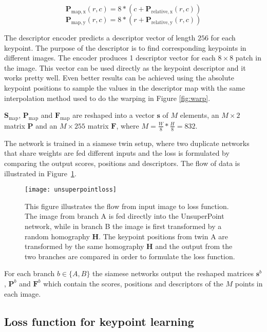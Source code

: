 \begin{equation}
\textbf{P}_{\mathrm{map,x}}(r,c) = 8 * (c + \textbf{P}_{\mathrm{relative,x}}(r,c))
\end{equation}
\begin{equation}
\textbf{P}_{\mathrm{map,y}}(r,c) = 8 * (r + \textbf{P}_{\mathrm{relative,y}}(r,c))
\end{equation}

The descriptor encoder predicts a descriptor vector of length $256$ for each keypoint. The purpose of the descriptor is to find corresponding keypoints in different images. The encoder produces 1 descriptor vector for each $8\times 8$ patch in the image. This vector can be used directly as the keypoint descriptor and it works pretty well. Even better results can be achieved using the absolute keypoint positions to sample the values in the descriptor map with the same interpolation method used to do the warping in Figure \ref{fig:warp}.

$\textbf{S}_{\textrm{map}}$, $\textbf{P}_{\mathrm{map}}$ and $\textbf{F}_{\mathrm{map}}$ are reshaped into a vector $\textbf{s}$ of $M$ elements, an $M\times 2$ matrix $\textbf{P}$ and an $M\times 255$ matrix $\textbf{F}$, where $M=\frac{W}{8}*\frac{H}{8}=832$.

The network is trained in a siamese twin setup, where two duplicate networks that share weights are fed different inputs and the loss is formulated by comparing the output scores, positions and descriptors. The flow of data is illustrated in Figure~\ref{fig:unsuperpointloss}.

\begin{figure}[H]
	\centering
	\texttt{[image: unsuperpointloss]}
	\caption{This figure illustrates the flow from input image to loss function. The image from branch A is fed directly into the UnsuperPoint network, while in branch B the image is first transformed by a random homography $\textbf{H}$. The keypoint positions from twin A are transformed by the same homography $\textbf{H}$ and the output from the two branches are compared in order to formulate the loss function.}
	\label{fig:unsuperpointloss}
\end{figure}

For each branch $b\in\{A,B\}$ the siamese networks output the reshaped matrices $\textbf{s}^b$, $\textbf{P}^b$ and $\textbf{F}^b$ which contain the scores, positions and descriptors of the $M$ points in each image.

\subsection{Loss function for keypoint learning}\label{sec:keypointloss}

